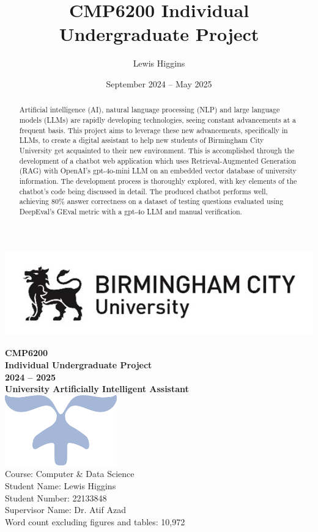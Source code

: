 \documentclass[12pt]{report}
\title{CMP6200 Individual Undergraduate Project}
\author{Lewis Higgins}
\date{September 2024 – May 2025}
\begin{document}
\makeatletter
\begin{titlepage}
    \includegraphics[width=0.3\linewidth]{BCUWide.jpg}\\[4ex]
    \vspace{1cm}
    \begin{center}
        {\huge \bfseries  CMP6200}\\[2ex]
        {\huge \bfseries  Individual Undergraduate Project}\\[2ex]
        {\huge \bfseries 2024 – 2025}\\[16ex]
        {\huge \bfseries University Artificially Intelligent Assistant}\\[6ex]
        \includegraphics[width=0.1\linewidth]{Symbol.png}\\[40ex]
        Course: Computer \& Data Science\\
        Student Name: Lewis Higgins\\
        Student Number: 22133848\\
        Supervisor Name: Dr. Atif Azad\\
        Word count excluding figures and tables: 10,972
    \end{center}
\end{titlepage}
\makeatother
\thispagestyle{empty}
\newpage

\begin{abstract}
    Artificial intelligence (AI), natural language processing (NLP) and large language models (LLMs) are
    rapidly developing technologies, seeing constant advancements at a frequent basis.
    This project aims to leverage these new advancements, specifically in LLMs, to create a digital assistant 
    to help new students of Birmingham City University get acquainted to their new environment. This is accomplished 
    through the development of a chatbot web application which uses Retrieval-Augmented Generation (RAG) with 
    OpenAI's gpt-4o-mini LLM on an embedded vector database of university information. The development process 
    is thoroughly explored, with key elements of the chatbot's code being discussed in detail.
    The produced chatbot performs well, achieving 80\% answer correctness on a dataset of testing questions
    evaluated using DeepEval's GEval metric with a gpt-4o LLM and manual verification.
\end{abstract}
\end{document}
